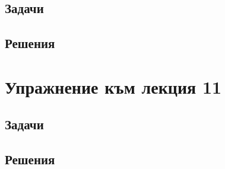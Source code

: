 \documentclass[a4paper,fleqn,12pt]{article}
\theoremstyle{definition}
\begin{document}
\subsection{Задачи}

\newpage
\subsection{Решения}

\newpage 
\section{Упражнение към лекция 11}

\subsection{Задачи}

\newpage
\subsection{Решения}
\end{document}
